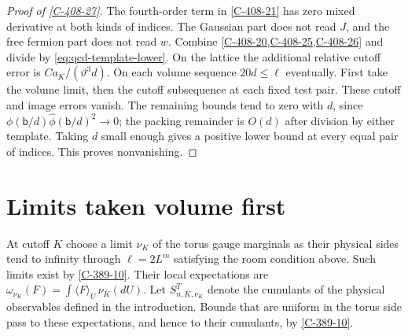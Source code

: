 \documentclass[11pt,letterpaper,reqno]{amsart}
\theoremstyle{definition}
\theoremstyle{remark}
\begin{document}
\begin{proof}[Proof of \cref{C-408-27}]
The fourth-order term in \cref{C-408-21} has zero mixed derivative
at both kinds of indices. The Gaussian part does not read $J$,
and the free fermion part does not read $w$. Combine
\cref{C-408-20,C-408-25,C-408-26} and divide by
\eqref{eq:qcd-template-lower}. On the lattice the additional
relative cutoff error is $C a_K/(\vartheta^3d)$.
On each volume sequence $20d\le\ell$ eventually.
First take the volume limit, then the cutoff subsequence at each
fixed test pair. These cutoff and image errors vanish.
The remaining bounds tend to zero with $d$, since
$\phi(\mathsf b/d)\widehat\phi(\mathsf b/d)^2\to0$;
the packing remainder is $O(d)$ after division by either
template. Taking $d$ small enough gives a positive lower bound
at every equal pair of indices. This proves nonvanishing.
\end{proof}

\section{Limits taken volume first}\label{sec:qcd-continuum}

At cutoff $K$ choose a limit $\nu_K$ of the torus gauge
marginals as their physical sides tend to infinity through
$\ell=2L^m$ satisfying the room condition above. Such limits
exist by \cref{C-389-10}. Their local expectations are
$\omega_{\nu_K}(F)=\int\langle F\rangle_U\,\nu_K(dU)$.
Let $S^T_{n,K,\nu_K}$ denote the cumulants of the physical
observables defined in the introduction. Bounds that are uniform
in the torus side pass to these expectations, and hence to
their cumulants, by \cref{C-389-10}.
\end{document}
